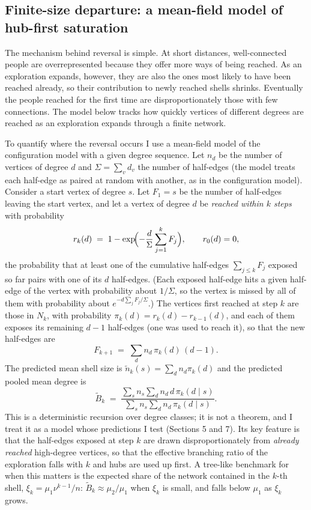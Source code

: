 \documentclass{nws}
\begin{document}
\subsection{Finite-size departure: a mean-field model of hub-first saturation}

The mechanism behind reversal is simple. At short distances, well-connected people are overrepresented because they offer more ways of being reached. As an exploration expands, however, they are also the ones most likely to have been reached already, so their contribution to newly reached shells shrinks. Eventually the people reached for the first time are disproportionately those with few connections. The model below tracks how quickly vertices of different degrees are reached as an exploration expands through a finite network.

To quantify where the reversal occurs I use a mean-field model of the
configuration model with a given degree sequence. Let $n_d$ be the number of
vertices of degree $d$ and $\Sigma=\sum_v d_v$ the number of half-edges (the model treats each half-edge as paired at random with another, as in the configuration model).
Consider a start vertex of degree $s$. Let $F_1=s$ be the number of
half-edges leaving the start vertex, and let a vertex of degree $d$ be
\emph{reached within $k$ steps} with probability
\begin{equation*}
r_k(d)\;=\;1-\exp\!\Bigl(-\frac{d}{\Sigma}\sum_{j=1}^{k}F_j\Bigr),\qquad r_0(d)=0,
\end{equation*}
the probability that at least one of the cumulative half-edges $\sum_{j\le k}F_j$
exposed so far pairs with one of its $d$ half-edges. (Each exposed half-edge hits a given half-edge of the vertex with probability about $1/\Sigma$, so the vertex is missed by all of them with probability about $e^{-d\sum_jF_j/\Sigma}$.) The vertices first reached
at step $k$ are those in $N_k$, with probability $\pi_k(d)=r_k(d)-r_{k-1}(d)$,
and each of them exposes its remaining $d-1$ half-edges (one was used to reach it), so that the new half-edges are
\begin{equation*}
F_{k+1}\;=\;\sum_d n_d\,\pi_k(d)\,(d-1).
\end{equation*}
The predicted mean shell size is $\tilde n_k(s)=\sum_d n_d\pi_k(d)$ and the
predicted pooled mean degree is
\begin{equation*}
\tilde B_k \;=\; \frac{\sum_s n_s\sum_d n_d\,d\,\pi_k(d\mid s)}{\sum_s n_s\sum_d n_d\,\pi_k(d\mid s)} .
\end{equation*}
This is a deterministic recursion over degree classes; it is not a theorem, and
I treat it as a model whose predictions I test (Sections 5 and 7). Its
key feature is that the half-edges exposed at step $k$ are drawn
disproportionately from \emph{already reached} high-degree vertices, so that
the effective branching ratio of the exploration falls with $k$ and hubs are
used up first. A tree-like benchmark for when this matters is the expected
share of the network contained in the $k$-th shell, $\xi_k=\mu_1\nu^{k-1}/n$:
$\tilde B_k\approx\mu_2/\mu_1$ when $\xi_k$ is small, and falls below $\mu_1$ as
$\xi_k$ grows.
\end{document}
